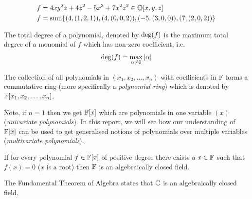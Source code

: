 \documentclass[a4paper,11pt]{article}
\begin{document}
\begin{equation}{\label{eq:polynomialexample}}
    \begin{aligned}
        f&=4xy^2z+4z^2-5x^3+7x^2z^2\in\mathbb{Q}[x,y,z]\\
        f&=\operatorname{sum}\{(4,(1,2,1)), (4,(0,0,2)), (-5,(3,0,0)), (7,(2,0,2))\}
    \end{aligned}
\end{equation}
\begin{defn}
    The total degree of a polynomial, denoted by $\operatorname{deg}(f)$ is the maximum total degree of a monomial of $f$ which has non-zero coefficient, i.e.
    \begin{equation}
        \operatorname{deg}(f) = \max_{\alpha\neq0} |\alpha|
    \end{equation}
\end{defn}
The collection of all polynomials in $(x_1, x_2, \ldots, x_n)$ with coefficients in $\mathbb{F}$ forms a commutative ring (more specifically a \emph{polynomial ring}) which is denoted by $\mathbb{F}[x_1, x_2, \ldots, x_n]$.

Note, if $n=1$ then we get $\mathbb{F}[x]$ which are polynomials in one variable $(x)$ (\emph{univariate polynomials}). In this report, we will see how our understanding of $\mathbb{F}[x]$ can be used to get generalised notions of polynomials over multiple variables (\emph{multivariate polynomials}).
\begin{defn} 
    If for every polynomial $f\in\mathbb{F}[x]$ of positive degree there exists a $x\in\mathbb{F}$ such that $f(x)=0$ ($x$ is a root) then $\mathbb{F}$ is an algebraically closed field.

    The Fundamental Theorem of Algebra states that $\mathbb{C}$ is an algebraically closed field.
\end{defn}
\end{document}
